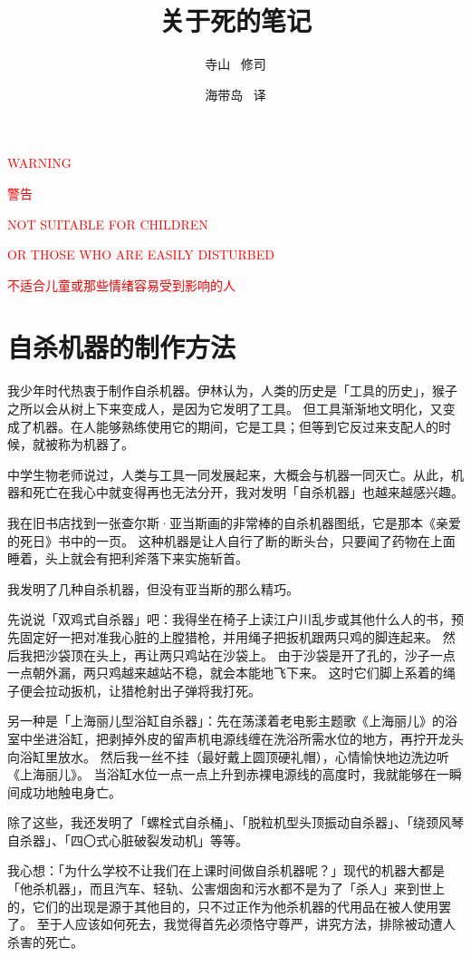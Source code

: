 \documentclass[UTF8]{ctexart}
\title{关于死的笔记}
\author{寺山 \ 修司}
\date{海带岛 \ 译}
\begin{document}
\centerline{\large{\textcolor{red}{WARNING}}}
\centerline{\large{\textcolor{red}{警告}}}

\centerline{\textcolor{red}{NOT SUITABLE FOR CHILDREN }}
\centerline{\textcolor{red}{OR THOSE WHO ARE EASILY DISTURBED}}
\centerline{\textcolor{red}{不适合儿童或那些情绪容易受到影响的人}}


\newpage

\maketitle

\newpage
\tableofcontents
\newpage

\section{自杀机器的制作方法}
我少年时代热衷于制作自杀机器。伊林认为，人类的历史是「工具的历史」，猴子之所以会从树上下来变成人，是因为它发明了工具。
但工具渐渐地文明化，又变成了机器。在人能够熟练使用它的期间，它是工具；但等到它反过来支配人的时候，就被称为机器了。

中学生物老师说过，人类与工具一同发展起来，大概会与机器一同灭亡。从此，机器和死亡在我心中就变得再也无法分开，我对发明「自杀机器」也越来越感兴趣。

我在旧书店找到一张查尔斯·亚当斯画的非常棒的自杀机器图纸，它是那本《亲爱的死日》书中的一页。
这种机器是让人自行了断的断头台，只要闻了药物在上面睡着，头上就会有把利斧落下来实施斩首。

我发明了几种自杀机器，但没有亚当斯的那么精巧。

先说说「双鸡式自杀器」吧：我得坐在椅子上读江户川乱步或其他什么人的书，预先固定好一把对准我心脏的上膛猎枪，并用绳子把扳机跟两只鸡的脚连起来。
然后我把沙袋顶在头上，再让两只鸡站在沙袋上。
由于沙袋是开了孔的，沙子一点一点朝外漏，两只鸡越来越站不稳，就会本能地飞下来。
这时它们脚上系着的绳子便会拉动扳机，让猎枪射出子弹将我打死。

另一种是「上海丽儿型浴缸自杀器」：先在荡漾着老电影主题歌《上海丽儿》的浴室中坐进浴缸，把剥掉外皮的留声机电源线缠在洗浴所需水位的地方，再拧开龙头向浴缸里放水。
然后我一丝不挂（最好戴上圆顶硬礼帽），心情愉快地边洗边听《上海丽儿》。
当浴缸水位一点一点上升到赤裸电源线的高度时，我就能够在一瞬间成功地触电身亡。

除了这些，我还发明了「螺栓式自杀桶」、「脱粒机型头顶振动自杀器」、「绕颈风琴自杀器」、「四〇式心脏破裂发动机」等等。

我心想：「为什么学校不让我们在上课时间做自杀机器呢？」现代的机器大都是「他杀机器」，而且汽车、轻轨、公害烟囱和污水都不是为了「杀人」来到世上的，它们的出现是源于其他目的，只不过正作为他杀机器的代用品在被人使用罢了。
至于人应该如何死去，我觉得首先必须恪守尊严，讲究方法，排除被动遭人杀害的死亡。
\end{document}

